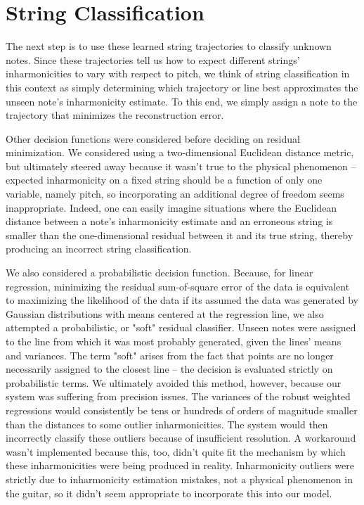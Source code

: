 \documentclass[12pt]{cmuthesis}
\begin{document}
\section{String Classification}
The next step is to use these learned string trajectories to classify unknown notes. Since these trajectories tell us how to expect different strings' inharmonicities to vary with respect to pitch, we think of string classification in this context as simply determining which trajectory or line best approximates the unseen note's inharmonicity estimate. To this end, we simply assign a note to the trajectory that minimizes the reconstruction error. 

Other decision functions were considered before deciding on residual minimization. We considered using a two-dimensional Euclidean distance metric, but ultimately steered away because it wasn't true to the physical phenomenon -- expected inharmonicity on a fixed string should be a function of only one variable, namely pitch, so incorporating an additional degree of freedom seems inappropriate. Indeed, one can easily imagine situations where the Euclidean distance between a note's inharmonicity estimate and an erroneous string is smaller than the one-dimensional residual between it and its true string, thereby producing an incorrect string classification. 

We also considered a probabilistic decision function. Because, for linear regression, minimizing the residual sum-of-square error of the data is equivalent to maximizing the likelihood of the data if its assumed the data was generated by Gaussian distributions with means centered at the regression line, we also attempted a probabilistic, or "soft" residual classifier. Unseen notes were assigned to the line from which it was most probably generated, given the lines' means and variances. The term "soft" arises from the fact that points are no longer necessarily assigned to the closest line -- the decision is evaluated strictly on probabilistic terms. We ultimately avoided this method, however, because our system was suffering from precision issues. The variances of the robust weighted regressions would consistently be tens or hundreds of orders of magnitude smaller than the distances to some outlier inharmonicities. The system would then incorrectly classify these outliers because of insufficient resolution. A workaround wasn't implemented because this, too, didn't quite fit the mechanism by which these inharmonicities were being produced in reality. Inharmonicity outliers were strictly due to inharmonicity estimation mistakes, not a physical phenomenon in the guitar, so it didn't seem appropriate to incorporate this into our model.
\end{document}
